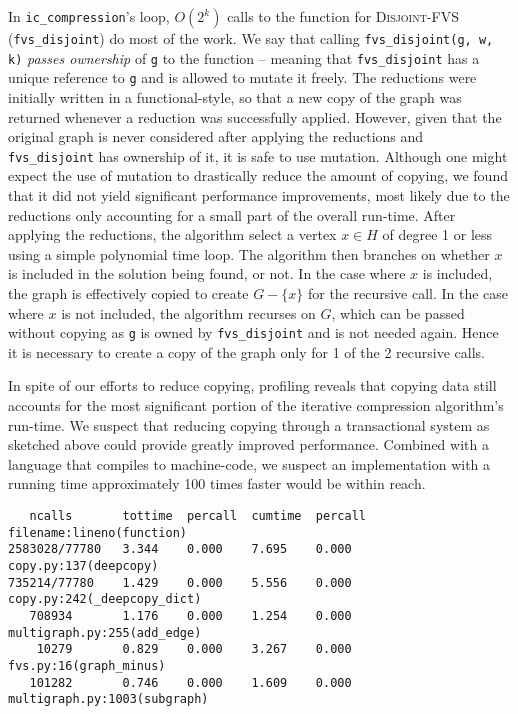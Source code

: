 \documentclass[a4paper,12pt]{article}
\begin{document}
In \texttt{ic\_compression}'s loop, $O(2^k)$ calls to the function for \textsc{Disjoint-FVS} (\texttt{fvs\_disjoint}) do most of the work. We say that calling \texttt{fvs\_disjoint(g, w, k)} \textit{passes ownership} of \texttt{g} to the function -- meaning that \texttt{fvs\_disjoint} has a unique reference to \texttt{g} and is allowed to mutate it freely. The reductions were initially written in a functional-style, so that a new copy of the graph was returned whenever a reduction was successfully applied. However, given that the original graph is never considered after applying the reductions and \texttt{fvs\_disjoint} has ownership of it, it is safe to use mutation. Although one might expect the use of mutation to drastically reduce the amount of copying, we found that it did not yield significant performance improvements, most likely due to the reductions only accounting for a small part of the overall run-time. After applying the reductions, the algorithm select a vertex $x \in H$ of degree 1 or less using a simple polynomial time loop. The algorithm then branches on whether $x$ is included in the solution being found, or not. In the case where $x$ is included, the graph is effectively copied to create $G - \{x\}$ for the recursive call. In the case where $x$ is not included, the algorithm recurses on $G$, which can be passed without copying as \texttt{g} is owned by \texttt{fvs\_disjoint} and is not needed again. Hence it is necessary to create a copy of the graph only for 1 of the 2 recursive calls.

In spite of our efforts to reduce copying, profiling reveals that copying data still accounts for the most significant portion of the iterative compression algorithm's run-time. We suspect that reducing copying through a transactional system as sketched above could provide greatly improved performance. Combined with a language that compiles to machine-code, we suspect an implementation with a running time approximately 100 times faster would be within reach.

\begin{verbatim}
   ncalls       tottime  percall  cumtime  percall  filename:lineno(function)
2583028/77780   3.344    0.000    7.695    0.000    copy.py:137(deepcopy)
735214/77780    1.429    0.000    5.556    0.000    copy.py:242(_deepcopy_dict)
   708934       1.176    0.000    1.254    0.000    multigraph.py:255(add_edge)
    10279       0.829    0.000    3.267    0.000    fvs.py:16(graph_minus)
   101282       0.746    0.000    1.609    0.000    multigraph.py:1003(subgraph)
\end{verbatim}
\end{document}

